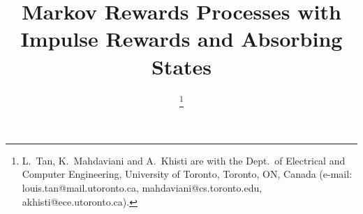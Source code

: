 \documentclass[journal,onecolumn,12pt,twoside]{IEEEtranTCOM}
\begin{document}
%
\title{Markov Rewards Processes with Impulse Rewards and Absorbing States}
%
%


\author{
\thanks{L.~Tan, K.~Mahdaviani and A.~Khisti are with the Dept.\ of Electrical and Computer Engineering, University of Toronto, Toronto, ON, Canada (e-mail: louis.tan@mail.utoronto.ca, mahdaviani@cs.toronto.edu, akhisti@ece.utoronto.ca). 
}%
}%
\end{document}
